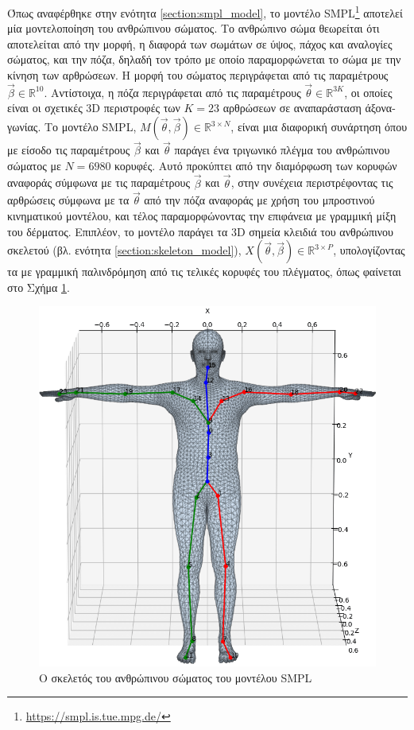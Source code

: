 Όπως αναφέρθηκε στην ενότητα \ref{section:smpl_model}, το μοντέλο SMPL\footnote{\href{https://smpl.is.tue.mpg.de/}{https://smpl.is.tue.mpg.de/}} αποτελεί μία μοντελοποίηση του ανθρώπινου σώματος. Το ανθρώπινο σώμα θεωρείται ότι αποτελείται από την μορφή, η διαφορά των σωμάτων σε ύψος, πάχος και αναλογίες σώματος, και την πόζα, δηλαδή τον τρόπο με  οποίο παραμορφώνεται το σώμα με την κίνηση των αρθρώσεων. Η μορφή του σώματος περιγράφεται από τις παραμέτρους $\vec{\beta} \in \mathbb{R}^{10}$. Αντίστοιχα, η πόζα περιγράφεται από τις παραμέτρους $\vec{\theta} \in \mathbb{R}^{3K}$, οι οποίες είναι οι σχετικές 3D περιστροφές των $K = 23$ αρθρώσεων σε αναπαράσταση άξονα-γωνίας. Το μοντέλο SMPL, $M(\vec{\theta},\vec{\beta}) \in \mathbb{R}^{3 \times N}$, είναι μια διαφορική συνάρτηση όπου με είσοδο τις παραμέτρους $\vec{\beta}$ και $\vec{\theta}$ παράγει ένα τριγωνικό πλέγμα του ανθρώπινου σώματος με $Ν = 6980$ κορυφές. Αυτό προκύπτει από την διαμόρφωση των κορυφών αναφοράς σύμφωνα με τις παραμέτρους $\vec{\beta}$ και $\vec{\theta}$, στην συνέχεια περιστρέφοντας τις αρθρώσεις σύμφωνα με τα $\vec{\theta}$ από την πόζα αναφοράς με χρήση του μπροστινού κινηματικού μοντέλου, και τέλος παραμορφώνοντας την επιφάνεια με γραμμική μίξη του δέρματος. Επιπλέον, το μοντέλο παράγει τα 3D σημεία κλειδιά του ανθρώπινου σκελετού (βλ. ενότητα \ref{section:skeleton_model}), $X(\vec{\theta},\vec{\beta}) \in \mathbb{R}^{3 \times P}$, υπολογίζοντας τα με γραμμική παλινδρόμηση από τις τελικές κορυφές του πλέγματος, όπως φαίνεται στο Σχήμα \ref{fig:smpl_skeleton}.

\begin{figure}[h]
	\centering
	\includegraphics[scale=0.3]{images/chapter3/smpl_skeleton.png}
	\caption{Ο σκελετός του ανθρώπινου σώματος του μοντέλου SMPL}
	\label{fig:smpl_skeleton}
\end{figure}


